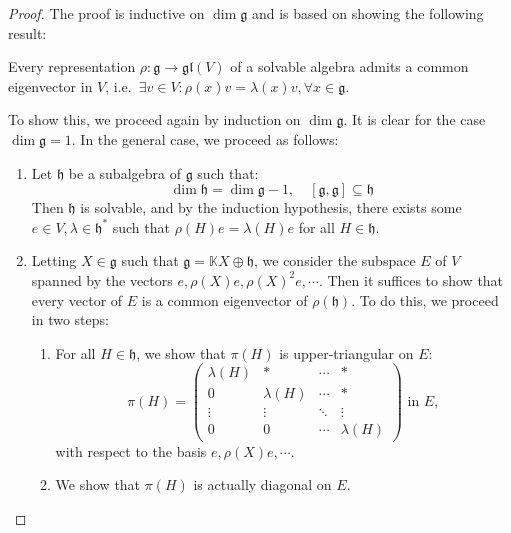 \documentclass{report}
\begin{document}
\begin{proof}
    The proof is inductive on $\dim \mathfrak g$ and is based on showing the following result:
\begin{center}
        Every representation $\rho: \mathfrak g \to \mathfrak{gl}(V)$ of a solvable algebra admits a common eigenvector in $V$, i.e.\  $\exists v \in V: \rho(x) v = \lambda(x) v, \forall x \in \mathfrak g$.
\end{center}
To show this, we proceed again by induction on $\dim \mathfrak g$.
It is clear for the case $\dim \mathfrak g = 1$.
In the general case, we proceed as follows:
\begin{enumerate}
    \item Let $\mathfrak h$ be a subalgebra of $\mathfrak g$ such that:
    \[
    \dim \mathfrak h = \dim \mathfrak g - 1, \quad [\mathfrak g, \mathfrak g] \subseteq \mathfrak h
    \]
    Then $\mathfrak h$ is solvable, and by the induction hypothesis, there exists some $e \in V, \lambda \in \mathfrak h^*$ such that $\rho(H)e = \lambda(H)e$ for all $H \in \mathfrak h$.
    \item Letting $X \in \mathfrak g$ such that $\mathfrak g = \mathbb K X \oplus \mathfrak h$, we consider the subspace $E$ of $V$ spanned by the vectors $e, \rho(X)e, \rho(X)^2 e, \cdots$.
    Then it suffices to show that every vector of $E$ is a common eigenvector of $\rho(\mathfrak h)$.
    To do this, we proceed in two steps:
    \begin{enumerate}
        \item For all $H \in \mathfrak h$, we show that $\pi(H)$ is upper-triangular on $E$:
        \[
        \pi(H) = \begin{pmatrix}
            \lambda(H) & * & \cdots & *\\
            0 & \lambda(H) & \cdots & *\\
            \vdots & \vdots & \ddots & \vdots\\
            0 & 0 & \cdots & \lambda(H)
        \end{pmatrix} \text{ in } E,
        \]
        with respect to the basis $e, \rho(X)e, \cdots$.
        \item We show that $\pi(H)$ is actually diagonal on $E$.
    \end{enumerate}
\end{enumerate}
\end{proof}
\end{document}

